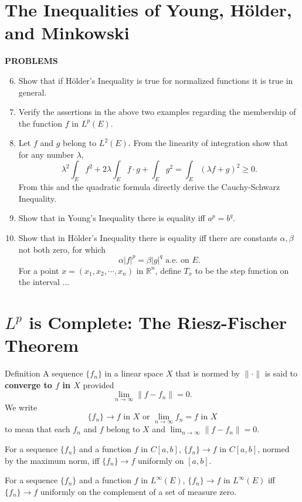 \section{The Inequalities of Young, H\"older, and Minkowski}

\begin{center}
	\textbf{PROBLEMS}
\end{center}
\begin{enumerate}
	\setcounter{enumi}{5}
	\item Show that if H\"older's Inequality is true for normalized functions it is true in general.
	\item Verify the assertions in the above two examples regarding the membership of the function $f$ in $L^p(E)$. 
	\item Let $f$ and $g$ belong to $L^2(E)$. From the linearity of integration show that for any number $\lambda$,
	\[
		\lambda^2\int_Ef^2+2\lambda\int_Ef\cdot g+\int_Eg^2=\int_E(\lambda f+g)^2\ge0.	
	\] 
	From this and the quadratic formula directly derive the Cauchy-Schwarz Inequality.
	\item Show that in Young's Inequality there is equality iff $a^p=b^q$.
	\item Show that in H\"older's Inequality there is equality iff there are constants $\alpha,\beta$ not both zero, for which
	\[
		\alpha|f|^p=\beta|g|^q\text{ a.e. on }E.	
	\]
	For a point $x=(x_1,x_2,\cdots,x_n)$ in $\mathbb{R}^n$, define $T_x$ to be the step function on the interval ...
\end{enumerate}

\section{$L^p$ is Complete: The Riesz-Fischer Theorem}
\begin{namedthm*}{Definition}
	A sequence $\{f_n\}$ in a linear space $X$ that is normed by $\|\cdot\|$ is said to \textbf{converge to $f$ in $X$} provided
	\[
		\lim_{n\to\infty}\|f-f_n\|=0.
	\]
	We write 
	\[
		\{f_n\}\to f\text{ in }X\text{ or }\lim_{n\to\infty}f_n=f\text{ in }X
	\]
	to mean that each $f_n$ and $f$ belong to $X$ and $\lim_{n\to\infty}\|f-f_n\|=0$.
\end{namedthm*}
For a sequence $\{f_n\}$ and a function $f$ in $C[a,b]$, $\{f_n\}\to f$ in $C[a,b]$, normed by the maximum norm, iff $\{f_n\}\to f$ uniformly on $[a,b]$.

For a sequence $\{f_n\}$ and a function $f$ in $L^\infty(E)$, $\{f_n\}\to f$ in $L^\infty(E)$ iff $\{f_n\}\to f$ uniformly on the complement of a set of measure zero.


